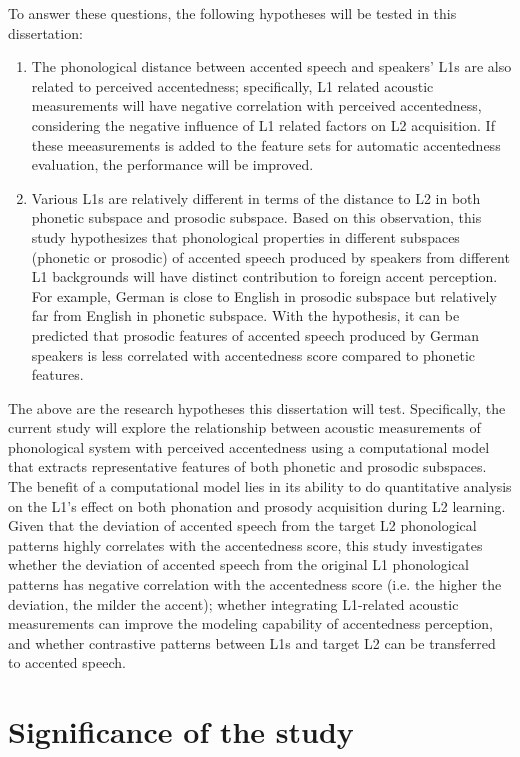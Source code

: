 To answer these questions, the following hypotheses will be tested in this dissertation:
\begin{enumerate}
\item The phonological distance between accented speech and speakers' L1s are also related to perceived accentedness; specifically, L1 related acoustic measurements will have negative correlation with perceived accentedness, considering the negative influence of L1 related factors on L2 acquisition. If these meeasurements is added to the feature sets for automatic accentedness evaluation, the performance will be improved.
\item Various L1s are relatively different in terms of the distance to L2 in both phonetic subspace and prosodic subspace. Based on this observation, this study hypothesizes that phonological properties in different subspaces (phonetic or prosodic) of accented speech produced by speakers from different L1 backgrounds will have distinct contribution to foreign accent perception. For example, German is close to English in prosodic subspace but relatively far from English in phonetic subspace. With the hypothesis, it can be predicted that prosodic features of accented speech produced by German speakers is less correlated with accentedness score compared to phonetic features.
\end{enumerate}

The above are the research hypotheses this dissertation will test. Specifically, the current study will explore the relationship between acoustic measurements of phonological system with perceived accentedness using a computational model that extracts representative features of both phonetic and prosodic subspaces. The benefit of a computational model lies in its ability to do quantitative analysis on the L1's effect on both phonation and prosody acquisition during L2 learning. Given that the deviation of accented speech from the target L2 phonological patterns highly correlates with the accentedness score, this study investigates whether the deviation of accented speech from the original L1 phonological patterns has negative correlation with the accentedness score (i.e. the higher the deviation, the milder the accent); whether integrating L1-related acoustic measurements can improve the modeling capability of accentedness perception, and whether contrastive patterns between L1s and target L2 can be transferred to accented speech.

\section{Significance of the study}

